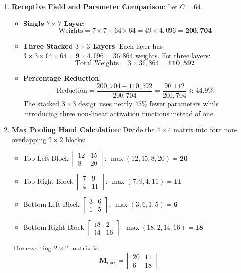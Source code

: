 \begin{enumerate}
    \item \textbf{Receptive Field and Parameter Comparison}:
    Let $C = 64$.
    \begin{itemize}
        \item \textbf{Single $7 \times 7$ Layer}:
        \begin{equation*}
        \text{Weights} = 7 \times 7 \times 64 \times 64 = 49 \times 4{,}096 = \mathbf{200{,}704}
        \end{equation*}
        \item \textbf{Three Stacked $3 \times 3$ Layers}:
        Each layer has $3 \times 3 \times 64 \times 64 = 9 \times 4{,}096 = 36{,}864$ weights.
        For three layers:
        \begin{equation*}
        \text{Total Weights} = 3 \times 36{,}864 = \mathbf{110{,}592}
        \end{equation*}
        \item \textbf{Percentage Reduction}:
        \begin{equation*}
        \text{Reduction} = \frac{200{,}704 - 110{,}592}{200{,}704} = \frac{90{,}112}{200{,}704} \approx \mathbf{44.9\%}
        \end{equation*}
        The stacked $3 \times 3$ design uses nearly $45\%$ fewer parameters while introducing three non-linear activation functions instead of one.
    \end{itemize}

    \item \textbf{Max Pooling Hand Calculation}:
    Divide the $4 \times 4$ matrix into four non-overlapping $2 \times 2$ blocks:
    \begin{itemize}
        \item Top-Left Block $\begin{bmatrix} 12 & 15 \\ 8 & 20 \end{bmatrix}$: $\max(12, 15, 8, 20) = \mathbf{20}$
        \item Top-Right Block $\begin{bmatrix} 7 & 9 \\ 4 & 11 \end{bmatrix}$: $\max(7, 9, 4, 11) = \mathbf{11}$
        \item Bottom-Left Block $\begin{bmatrix} 3 & 6 \\ 1 & 5 \end{bmatrix}$: $\max(3, 6, 1, 5) = \mathbf{6}$
        \item Bottom-Right Block $\begin{bmatrix} 18 & 2 \\ 14 & 16 \end{bmatrix}$: $\max(18, 2, 14, 16) = \mathbf{18}$
    \end{itemize}
    The resulting $2 \times 2$ matrix is:
    \begin{equation*}
    \mathbf{M}_{\text{max}} = \begin{bmatrix}
    20 & 11 \\
    6  & 18
    \end{bmatrix}
    \end{equation*}


\end{enumerate}
